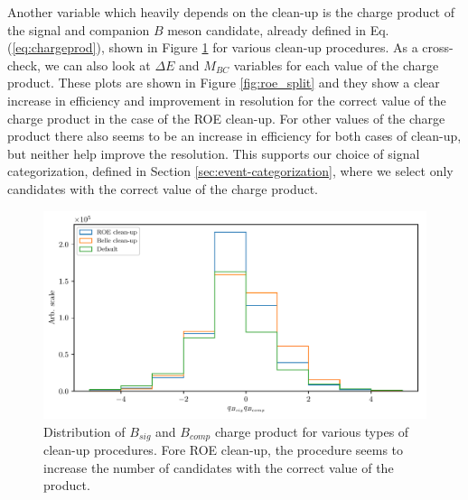 \documentclass[  headings=standardclasses,
  headings=big,oneside,a4paper,openany,12pt]{scrbook}
\begin{document}
Another variable which heavily depends on the clean-up is the charge product of the signal and companion $B$ meson candidate, already defined in Eq. (\ref{eq:chargeprod}), shown in Figure \ref{fig:roe_chargeproduct} for various clean-up procedures. As a cross-check, we can also look at $\Delta E$ and $M_{BC}$ variables for each value of the charge product. These plots are shown in Figure \ref{fig:roe_split} and they show a clear increase in efficiency and improvement in resolution for the correct value of the charge product in the case of the ROE clean-up. For other values of the charge product there also seems to be an increase in efficiency for both cases of clean-up, but neither help improve the resolution. This supports our choice of signal categorization, defined in Section \ref{sec:event-categorization}, where we select only candidates with the correct value of the charge product.

\begin{figure}[H]
\centering
\captionsetup{width=0.8\linewidth}
\includegraphics[width=\linewidth]{fig/roe_chargeprod}
\caption{Distribution of $B_{sig}$ and $B_{comp}$ charge product for various types of clean-up procedures. Fore ROE clean-up, the procedure seems to increase the number of candidates with the correct value of the product.}
\label{fig:roe_chargeproduct}
\end{figure}
\end{document}
